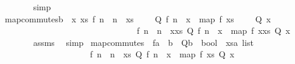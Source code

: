 \begin{isabellebody}
%
\isadelimproof
\ \ \ \ \ \ %
\endisadelimproof
%
\isatagproof
{}\isamarkupfalse%
\ simp%
\endisatagproof
{\isafoldproof}%
%
\isadelimproof
\isanewline
%
\endisadelimproof
\isanewline
\isanewline
{}\isamarkupfalse%
\ map{\isacharunderscore}commutes{\isacharunderscore}b{\isacharcolon}\ {\isachardoublequoteopen}{\isasymforall}\ x\ xs{\isachardot}\ {\isacharparenleft}{\isacharbrackleft}f\ n\ {\isachardot}\ n\ {\isacharless}{\isacharminus}\ xs{\isacharcomma}\ \ \ \ \ Q\ {\isacharparenleft}f\ n{\isacharparenright}{\isacharbrackright}\ {\isacharequal}\ {\isacharbrackleft}x\ {\isacharless}{\isacharminus}\ {\isacharparenleft}map\ f\ xs{\isacharparenright}{\isachardot}\ \ \ \ \ Q\ x{\isacharbrackright}\ {\isasymlongrightarrow}\ \isanewline
\ \ \ \ \ \ \ \ \ \ \ \ \ \ \ \ \ \ \ \ \ \ \ \ \ \ \ \ \ \ \ \ {\isacharbrackleft}f\ n\ {\isachardot}\ n\ {\isacharless}{\isacharminus}\ {\isacharparenleft}x{\isacharhash}xs{\isacharparenright}{\isacharcomma}\ Q\ {\isacharparenleft}f\ n{\isacharparenright}{\isacharbrackright}\ {\isacharequal}\ {\isacharbrackleft}x\ {\isacharless}{\isacharminus}\ {\isacharparenleft}map\ f\ {\isacharparenleft}x{\isacharhash}xs{\isacharparenright}{\isacharparenright}{\isachardot}\ Q\ x{\isacharbrackright}{\isacharparenright}{\isachardoublequoteclose}\ \isanewline
%
\isadelimproof
\ \ \ \ \ \ %
\endisadelimproof
%
\isatagproof
{}\isamarkupfalse%
\ assms\ \isamarkupfalse%
\ simp%
\endisatagproof
{\isafoldproof}%
%
\isadelimproof
\isanewline
%
\endisadelimproof
\isanewline
\isanewline
{}\isamarkupfalse%
\ map{\isacharunderscore}commutes{\isacharcolon}\ \ f{\isacharcolon}{\isacharcolon}{\isachardoublequoteopen}{\isacharprime}a\ {\isacharequal}{\isachargreater}\ {\isacharprime}b{\isachardoublequoteclose}\ \ Q{\isacharcolon}{\isacharcolon}{\isachardoublequoteopen}{\isacharprime}b\ {\isacharequal}{\isachargreater}\ bool{\isachardoublequoteclose}\ \ xs{\isacharcolon}{\isacharcolon}{\isachardoublequoteopen}{\isacharprime}a\ list{\isachardoublequoteclose}\ \isanewline
\ \ \ \ \ \ \ \ \ \ \ \ \ \ \ \ \ \ \ \ \ {\isachardoublequoteopen}{\isacharbrackleft}f\ n\ {\isachardot}\ n\ {\isacharless}{\isacharminus}\ xs{\isacharcomma}\ Q\ {\isacharparenleft}f\ n{\isacharparenright}{\isacharbrackright}\ {\isacharequal}\ {\isacharbrackleft}x\ {\isacharless}{\isacharminus}\ {\isacharparenleft}map\ f\ xs{\isacharparenright}{\isachardot}\ Q\ x{\isacharbrackright}{\isachardoublequoteclose}\isanewline
%
\isadelimproof
\ \ \ \ \ \ %

\end{isabellebody}
